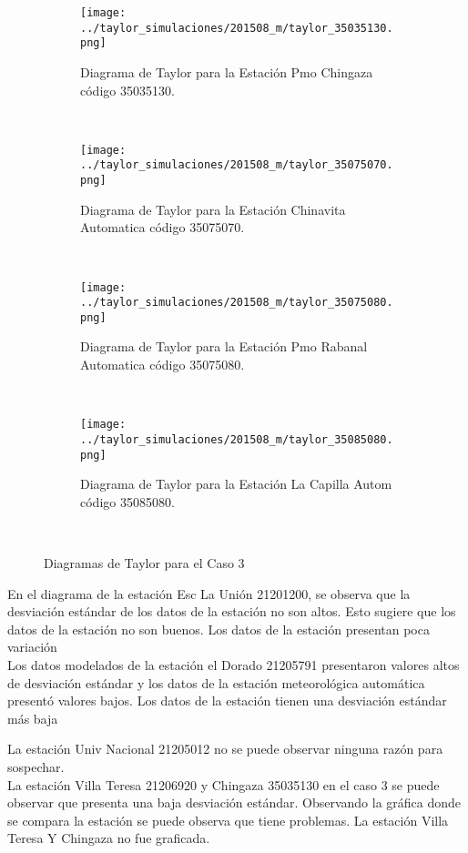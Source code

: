 \begin{figure}[H]\ContinuedFloat
\begin{subfigure}[normla]{0.5\textwidth}
\caption{Diagrama de Taylor para la Estación Pmo Chingaza código 35035130.}
\texttt{[image: ../taylor\_simulaciones/201508\_m/taylor\_35035130.png]}
\end{subfigure}
~
\begin{subfigure}[normla]{0.5\textwidth}
\caption{Diagrama de Taylor para la Estación Chinavita Automatica código 35075070.}
\texttt{[image: ../taylor\_simulaciones/201508\_m/taylor\_35075070.png]}
\end{subfigure}
~
\begin{subfigure}[normla]{0.5\textwidth}
\caption{Diagrama de Taylor para la Estación Pmo Rabanal Automatica  código 35075080.}
\texttt{[image: ../taylor\_simulaciones/201508\_m/taylor\_35075080.png]}
\end{subfigure}
~
\begin{subfigure}[normla]{0.5\textwidth}
\caption{Diagrama de Taylor para la Estación La Capilla Autom código 35085080.}
\texttt{[image: ../taylor\_simulaciones/201508\_m/taylor\_35085080.png]}
\end{subfigure}
~


\caption{Diagramas de Taylor para el Caso 3}
\label{caso3}
\end{figure}

En el diagrama de la estación Esc La Unión 21201200, se observa que la desviación estándar de los datos de la estación no son altos. Esto sugiere que los datos de la estación no son buenos. Los datos de la estación presentan poca variación \\

Los datos modelados de la estación el Dorado 21205791 presentaron valores altos de desviación estándar y los datos de la estación meteorológica automática presentó valores bajos. Los datos de la estación tienen una desviación estándar más baja

La estación Univ Nacional 21205012 no se puede observar ninguna razón para sospechar.\\

La estación Villa Teresa 21206920 y Chingaza 35035130 en el caso 3 se puede observar que presenta una baja desviación estándar. Observando la gráfica donde se compara la estación se puede observa que tiene problemas. La estación Villa Teresa Y Chingaza no fue graficada.



